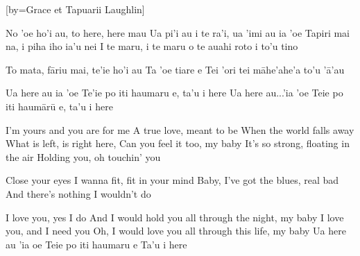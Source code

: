 [by={Grace et Tapuarii Laughlin}]
\transpose{\shift} %



%

\beginverse
No 'oe ho'i au, to here, here mau
Ua pi'i au i te ra'i, ua 'imi au ia 'oe
Tapiri mai na, i piha iho ia'u nei
I te maru, i te maru o te auahi roto i to'u tino

To mata, f\=ariu mai, te'ie ho'i au %
Ta 'oe tiare e
Tei 'ori tei m\=ahe'ahe'a to'u '\=a'au %
\endverse

\beginchorus
Ua here au ia 'oe
Te'ie po iti haumaru e, ta'u i here
Ua here au...'ia 'oe
Teie po iti haum\=ar\=u e, ta'u i here
\endchorus

\beginverse
I'm yours and you are for me
A true love, meant to be
When the world falls away
What is left, is right here,
Can you feel it too, my baby
It's so strong, floating in the air
Holding you, oh touchin' you

Close your eyes
I wanna fit, fit in your mind
Baby, I've got the blues, real bad
And there's nothing I wouldn't do
\endverse

\beginchorus
I love you, yes I do
And I would hold you all through the night, my baby
I love you, and I need you
Oh, I would love you all through this life, my baby
Ua here au 'ia oe
Teie po iti haumaru e
Ta'u i here
\endchorus

\endsong


